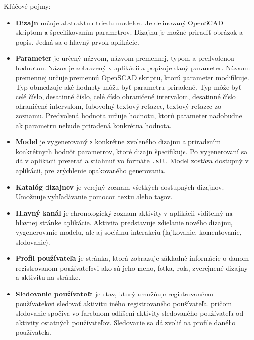 \documentclass[a4paper]{article}
\begin{document}
Kľúčové pojmy:
\begin{itemize}

\item
\textbf{Dizajn} určuje abstraktnú triedu modelov. 
Je definovaný OpenSCAD skriptom a špecifikovaním parametrov.
Dizajnu je možné priradiť obrázok a popis.
Jedná sa o hlavný prvok aplikácie.

\item
\textbf{Parameter} je určený názvom, názvom premennej, typom a predvolenou hodnotou.
Názov je zobrazený v aplikácii a popisuje daný parameter.
Názvom premennej určuje premennú OpenSCAD skriptu, ktorú parameter modifikuje.
Typ obmedzuje aké hodnoty môžu byť parametru priradené.
Typ môže byť celé číslo, desatinné číslo, 
celé číslo ohraničené intervalom, desatinné číslo ohraničené intervalom, 
ľubovolný textový reťazec, textový reťazec zo zoznamu.
Predvolená hodnota určuje hodnotu, ktorú parameter nadobudne
ak parametru nebude priradená konkrétna hodnota.

\item
\textbf{Model} je vygenerovaný z konkrétne zvoleného dizajnu
a priradením konkrétnych hodnôt parametrov, ktoré dizajn špecifikuje.
Po vygenerovaní sa dá v aplikácii prezerať a stiahnuť vo formáte \texttt{.stl}.
Model zostáva dostupný v aplikácii, pre zrýchlenie opakovaného generovania.

\item
\textbf{Katalóg dizajnov} je verejný zoznam všetkých dostupných dizajnov.
Umožnuje vyhľadávanie pomocou textu alebo tagov.

\item
\textbf{Hlavný kanál} je chronologický zoznam aktivity v aplikácii
viditelný na hlavnej stránke aplikácie.
Aktivita predstavuje zdielanie nového dizajnu, vygenerovanie modelu,
ale aj sociálnu interakciu (lajkovanie, komentovanie, sledovanie).

\item
\textbf{Profil používateľa} je stránka, ktorá zobrazuje 
základné informácie o danom registrovanom používateľovi ako sú jeho meno, fotka, 
rola, zverejnené dizajny a aktivitu na stránke.

\item
\textbf{Sledovanie používateľa} je stav, ktorý umožňuje
registrovanému používateľovi sledovať aktivitu iného registrovaného používateľa,
pričom sledovanie spočíva vo farebnom odlíšení aktivity sledovaného používateľa
od aktivity ostatných používateľov.
Sledovanie sa dá zvoliť na profile daného používateľa. 

\end{itemize}
\end{document}
